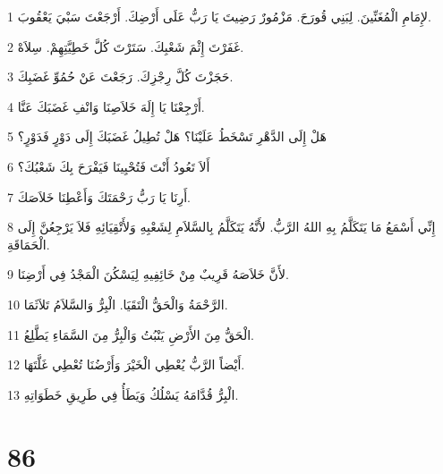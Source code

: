 \par 1 لإِمَامِ الْمُغَنِّينَ. لِبَنِي قُورَحَ. مَزْمُورٌ رَضِيتَ يَا رَبُّ عَلَى أَرْضِكَ. أَرْجَعْتَ سَبْيَ يَعْقُوبَ.
\par 2 غَفَرْتَ إِثْمَ شَعْبِكَ. سَتَرْتَ كُلَّ خَطِيَّتِهِمْ. سِلاَهْ.
\par 3 حَجَزْتَ كُلَّ رِجْزِكَ. رَجَعْتَ عَنْ حُمُوِّ غَضَبِكَ.
\par 4 أَرْجِعْنَا يَا إِلَهَ خَلاَصِنَا وَانْفِ غَضَبَكَ عَنَّا.
\par 5 هَلْ إِلَى الدَّهْرِ تَسْخَطُ عَلَيْنَا؟ هَلْ تُطِيلُ غَضَبَكَ إِلَى دَوْرٍ فَدَوْرٍ؟
\par 6 أَلاَ تَعُودُ أَنْتَ فَتُحْيِينَا فَيَفْرَحَ بِكَ شَعْبُكَ؟
\par 7 أَرِنَا يَا رَبُّ رَحْمَتَكَ وَأَعْطِنَا خَلاَصَكَ.
\par 8 إِنِّي أَسْمَعُ مَا يَتَكَلَّمُ بِهِ اللهُ الرَّبُّ. لأَنَّهُ يَتَكَلَّمُ بِالسَّلاَمِ لِشَعْبِهِ وَلأَتْقِيَائِهِ فَلاَ يَرْجِعُنَّ إِلَى الْحَمَاقَةِ.
\par 9 لأَنَّ خَلاَصَهُ قَرِيبٌ مِنْ خَائِفِيهِ لِيَسْكُنَ الْمَجْدُ فِي أَرْضِنَا.
\par 10 الرَّحْمَةُ وَالْحَقُّ الْتَقَيَا. الْبِرُّ وَالسَّلاَمُ تَلاَثَمَا.
\par 11 الْحَقُّ مِنَ الأَرْضِ يَنْبُتُ وَالْبِرُّ مِنَ السَّمَاءِ يَطَّلِعُ.
\par 12 أَيْضاً الرَّبُّ يُعْطِي الْخَيْرَ وَأَرْضُنَا تُعْطِي غَلَّتَهَا.
\par 13 الْبِرُّ قُدَّامَهُ يَسْلُكُ وَيَطَأُ فِي طَرِيقِ خَطَوَاتِهِ.

\chapter{86}

